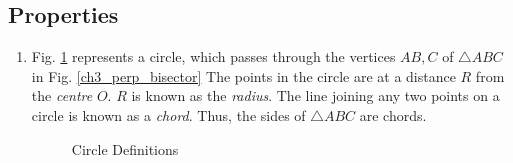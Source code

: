\subsection{Properties}
%
\renewcommand{\theequation}{\theenumi}
\begin{enumerate}[label=\arabic*.,ref=\thesubsection.\theenumi]
%
\item
	Fig. \ref{ch4_circle_def} represents a circle, which passes through the vertices $A B, C$ of  $\triangle ABC$ in Fig.  	\eqref{ch3_perp_bisector}	
 The points in the circle are at a distance $R$ from the {\em centre} $O$.  $R$ is known as the {\em radius}. The line  joining any two points on a circle is known as a {\em chord}.  Thus, the sides of $\triangle ABC$ are chords.

\begin{figure}[!ht]
	\begin{center}
		
		\resizebox{\columnwidth}{!}{}
	\end{center}
	\caption{Circle Definitions}
	\label{ch4_circle_def}	
\end{figure}

%
%
%
%		


\end{enumerate}
